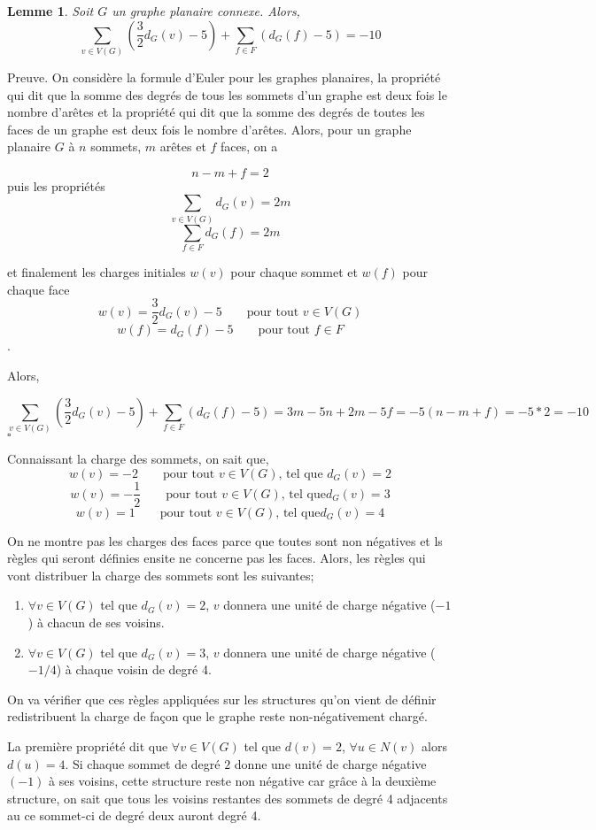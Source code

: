 \documentclass[10pt,a4paper]{article}
\newtheorem{lemme}{Lemme}
\newcommand{\ep}{{\hfill $\square$}}
\begin{document}
\begin{lemme}
Soit $G$ un graphe planaire connexe. Alors,
$$ \sum_{v \in V(G)} (\frac{3}{2} d_G(v) - 5) + \sum_{f\in F} (d_G(f) -5) = -10$$
\end{lemme}

Preuve.
On considère la formule d'Euler pour les graphes planaires, la propriété qui dit que la somme des degrés de tous les sommets d'un graphe est deux fois le nombre d'arêtes et la propriété qui dit que la somme des degrés de toutes les faces de un graphe est deux fois le nombre d'arêtes. Alors, pour un graphe planaire $G$ à $n$ sommets, $m$ arêtes et $f$ faces, on a

$$ n - m + f = 2 $$
puis les propriétés
$$ \sum_{v\in V(G)} d_G(v) = 2m$$
$$ \sum_{f\in F} d_G(f) = 2m$$

et finalement les charges initiales $w(v)$ pour chaque sommet et $w(f)$ pour chaque face
$$ w(v) = \frac{3}{2}d_G(v) - 5 \qquad \textrm{pour tout $v \in V(G)$}$$
$$ w(f) = d_G(f) - 5 \qquad \textrm{pour tout $f \in F$}$$.

Alors,

$$ \sum_{v \in V(G)} (\frac{3}{2}d_G(v) - 5) + \sum_{f\in F} (d_G(f) -5) = 3m -5n + 2m - 5f = -5(n - m + f) = -5*2 = -10$$
\ep 

Connaissant la charge des sommets, on sait que,
$$ w(v) = -2 \qquad \textrm{pour tout $v \in V(G)$, tel que } d_G(v) = 2$$
$$ w(v) = -\frac{1}{2} \qquad \textrm{pour tout $v \in V(G)$, tel que} d_G(v) = 3$$
$$ w(v) =  1 \qquad \textrm{pour tout $v \in V(G)$, tel que} d_G(v) = 4$$

On ne montre pas les charges des faces parce que toutes sont non négatives et ls règles qui seront définies ensite ne concerne pas les faces. Alors, les règles qui vont distribuer la charge des sommets sont les suivantes;

\begin{enumerate}
\item $\forall v \in V(G)$ tel que $d_G(v) = 2$, $v$ donnera une unité de charge négative ($-1$) à chacun de ses voisins.
\item $\forall v \in V(G)$ tel que $d_G(v) = 3$, $v$ donnera une unité de charge négative ($-1/4$) à chaque voisin de degré 4.
\end{enumerate}

On va vérifier que ces règles appliquées sur les structures qu'on vient de définir redistribuent la charge de façon que le graphe reste non-négativement chargé.

La première propriété dit que $\forall v\in V(G)$ tel que $d(v) =2$, $\forall u \in N(v)$ alors $d(u) =4$. Si chaque sommet de degré $2$ donne une unité de charge négative $(-1)$ à ses voisins, cette structure reste non négative car grâce à la deuxième structure, on sait que tous les voisins restantes des sommets de degré 4 adjacents au ce sommet-ci de degré deux auront degré 4. 
\end{document}

